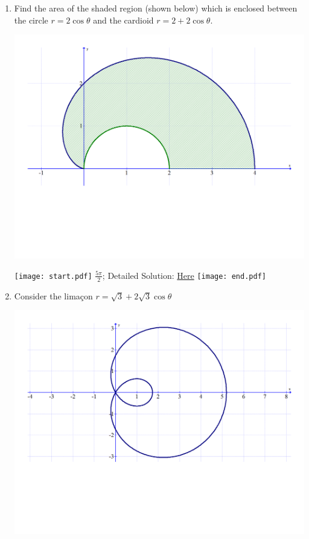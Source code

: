 \documentclass[12pt]{article}
\begin{document}
\begin{enumerate}
\item Find the area of the shaded region (shown below) which is enclosed between the circle $r=2\cos{\theta}$ and the cardioid $r=2+2\cos{\theta}$.

\begin{center}
\includegraphics[scale=0.4]{area.pdf}
\end{center}

\texttt{[image: start.pdf]}
{{$\frac{5\pi}{2}$; Detailed Solution: \textcolor{blue}{\href{http://www.math.drexel.edu/classes/Calculus/resources/Math122HW/Solutions/122_19_Polar_Calc_17.pdf}{Here}}}}
\texttt{[image: end.pdf]}


\item Consider the lima\c{c}on $r=\sqrt{3}+2\sqrt{3}\cos{\theta}$

\begin{center}
\includegraphics[scale=0.5]{limacon}
\end{center}


\end{enumerate}
\end{document}

